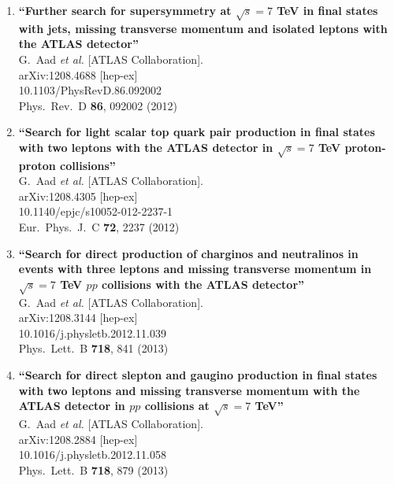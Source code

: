 \documentclass{article}
\begin{document}
\begin{enumerate}
\item%
{\bf ``Further search for supersymmetry at $\sqrt{s}=7$ TeV in final states with jets, missing transverse momentum and isolated leptons with the ATLAS detector''}
  \\{}G.~Aad {\it et al.}  [ATLAS Collaboration].
  \\{}arXiv:1208.4688 [hep-ex]
    \\{}10.1103/PhysRevD.86.092002
\\{}Phys.\ Rev.\ D {\bf 86}, 092002 (2012) %


\item%
{\bf ``Search for light scalar top quark pair production in final states with two leptons with the ATLAS detector in $\sqrt{s}=7$ TeV proton-proton collisions''}
  \\{}G.~Aad {\it et al.}  [ATLAS Collaboration].
  \\{}arXiv:1208.4305 [hep-ex]
    \\{}10.1140/epjc/s10052-012-2237-1
\\{}Eur.\ Phys.\ J.\ C {\bf 72}, 2237 (2012) %


\item%
{\bf ``Search for direct production of charginos and neutralinos in events with three leptons and missing transverse momentum in $\sqrt{s}=7$ TeV $pp$ collisions with the ATLAS detector''}
  \\{}G.~Aad {\it et al.}  [ATLAS Collaboration].
  \\{}arXiv:1208.3144 [hep-ex]
    \\{}10.1016/j.physletb.2012.11.039
\\{}Phys.\ Lett.\ B {\bf 718}, 841 (2013) %


\item%
{\bf ``Search for direct slepton and gaugino production in final states with two leptons and missing transverse momentum with the ATLAS detector in $pp$ collisions at $\sqrt{s}=7$ TeV''}
  \\{}G.~Aad {\it et al.}  [ATLAS Collaboration].
  \\{}arXiv:1208.2884 [hep-ex]
    \\{}10.1016/j.physletb.2012.11.058
\\{}Phys.\ Lett.\ B {\bf 718}, 879 (2013) %



\end{enumerate}
\end{document}
